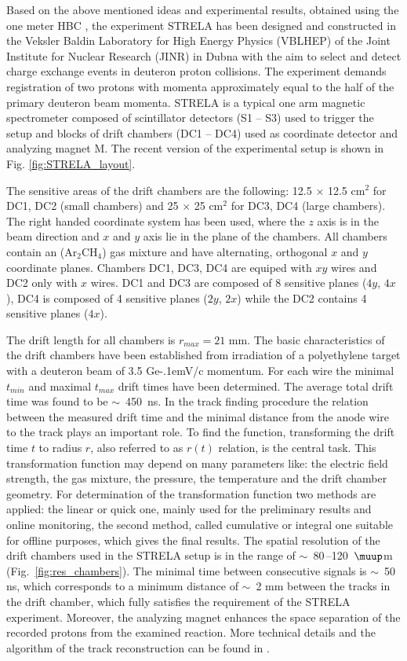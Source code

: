 \documentclass[twocolumn,epjc3]{svjour3}
\newcommand{\GeVc}   {Ge\kern-.1emV/c\xspace}
\begin{document}
Based on the above mentioned ideas and experimental results, obtained using the
one meter HBC \cite{gla02,gla08}, the experiment STRELA has been designed and
constructed in the Veksler Baldin Laboratory for High Energy Physics (VBLHEP) of
the Joint Institute for Nuclear Research (JINR) in Dubna with the aim to select
and detect charge exchange events in deuteron proton collisions. The experiment
demands registration of two protons with momenta approximately equal to the half
of the primary deuteron beam momenta. STRELA is a typical one arm magnetic
spectrometer composed of scintillator detectors (S1 -- S3) used to trigger the
setup and blocks of drift chambers (DC1 -- DC4) used as coordinate detector and
analyzing magnet M. The recent version of the experimental setup is shown in
Fig. \ref{fig:STRELA_layout}.

The sensitive areas of the drift chambers are the following: 12.5 $\times$ 12.5
cm$^2$ for DC1, DC2 (small chambers) and 25 $\times$ 25 cm$^2$ for DC3, DC4
(large chambers). The right handed coordinate system has been used, where the
$z$ axis is in the beam direction and $x$ and $y$ axis lie in the plane of the
chambers. All chambers contain an (Ar$_2$CH$_4$) gas mixture and have
alternating, orthogonal $x$ and $y$ coordinate planes. Chambers DC1, DC3, DC4
are equiped with $xy$ wires and DC2 only with $x$ wires. DC1 and DC3 are
composed of 8 sensitive planes ($4y$, $4x$), DC4 is composed of 4 sensitive
planes ($2y$, $2x$) while the DC2 contains 4 sensitive planes ($4x$).

The drift length for all chambers is $r_{max} = 21$ mm. The basic
characteristics of the drift chambers have been established from irradiation of
a polyethylene target with a deuteron beam of 3.5 \GeVc momentum. For each wire
the minimal $t_{min}$ and maximal $t_{max}$ drift times have been
determined. The average total drift time was found to be $\sim$~450~ns. In the
track finding procedure the relation between the measured drift time and the
minimal distance from the anode wire to the track plays an important role. To
find the function, transforming the drift time $t$ to radius $r$, also referred
to as $r(t)$ relation, is the central task. This transformation function may
depend on many parameters like: the electric field strength, the gas mixture,
the pressure, the temperature and the drift chamber geometry. For determination
of the transformation function two methods are applied: the linear or quick one,
mainly used for the preliminary results and online monitoring, the second
method, called cumulative or integral one suitable for offline purposes, which
gives the final results. The spatial resolution of the drift chambers used in
the STRELA setup is in the range of $\sim$~80\,--120~$\muup$m
(Fig.~\ref{fig:res_chambers}). The minimal time between consecutive signals is
$\sim$~50 ns, which corresponds to a minimum distance of $\sim$~2 mm between the
tracks in the drift chamber, which fully satisfies the requirement of the STRELA
experiment. Moreover, the analyzing magnet enhances the space separation of the
recorded protons from the examined reaction. More technical details and the
algorithm of the track reconstruction can be found in \cite{gla13}.
\end{document}
